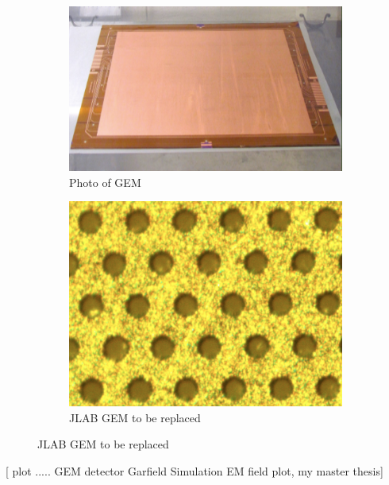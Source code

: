 \begin{figure}
     \centering
     \begin{subfigure}[b]{0.45\textwidth}
         \centering
         \includegraphics[width=\textwidth]{images/chap3/gem_foil_photo.png}
         \caption{Photo of GEM}
         \label{Photo of CEBAF}
     \end{subfigure}
     \hfill
     \begin{subfigure}[b]{0.45\textwidth}
         \centering
         \includegraphics[width=\textwidth]{images/chap3/gem_foil_micro.png}
         \caption{JLAB GEM to be replaced}
         \label{gem_structure}
     \end{subfigure}
\end{figure}

[ plot ..... GEM detector Garfield Simulation EM field plot, my master thesis]

